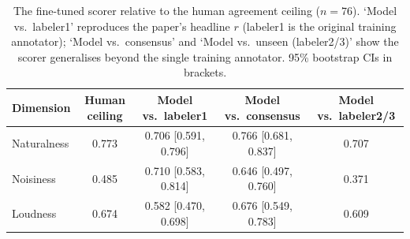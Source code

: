 \begin{table}[t]
\centering
\caption{The fine-tuned scorer relative to the human agreement ceiling ($n{=}76$). `Model vs.\ labeler1' reproduces the paper's headline $r$ (labeler1 is the original training annotator); `Model vs.\ consensus' and `Model vs.\ unseen (labeler2/3)' show the scorer generalises beyond the single training annotator. 95\% bootstrap CIs in brackets.}
\label{tab:human-ceiling}
\begin{tabular}{lcccc}
\toprule
Dimension & Human ceiling & Model vs.\ labeler1 & Model vs.\ consensus & Model vs.\ labeler2/3 \\
\midrule
Naturalness & 0.773 & 0.706 [0.591, 0.796] & 0.766 [0.681, 0.837] & 0.707 \\
Noisiness & 0.485 & 0.710 [0.583, 0.814] & 0.646 [0.497, 0.760] & 0.371 \\
Loudness & 0.674 & 0.582 [0.470, 0.698] & 0.676 [0.549, 0.783] & 0.609 \\
\bottomrule
\end{tabular}
\end{table}